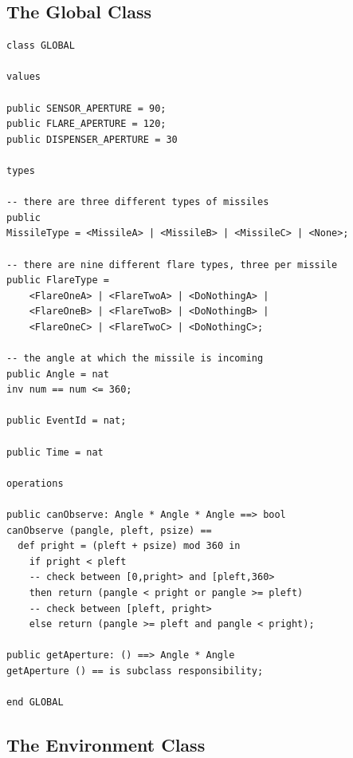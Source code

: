 \documentclass{overturerepchap}
\begin{document}
\subsection{The Global Class}

\begin{lstlisting}
class GLOBAL

values

public SENSOR_APERTURE = 90;
public FLARE_APERTURE = 120;
public DISPENSER_APERTURE = 30

types

-- there are three different types of missiles
public 
MissileType = <MissileA> | <MissileB> | <MissileC> | <None>;

-- there are nine different flare types, three per missile
public FlareType =
    <FlareOneA> | <FlareTwoA> | <DoNothingA> | 
    <FlareOneB> | <FlareTwoB> | <DoNothingB> | 
    <FlareOneC> | <FlareTwoC> | <DoNothingC>;

-- the angle at which the missile is incoming
public Angle = nat
inv num == num <= 360;

public EventId = nat;

public Time = nat

operations

public canObserve: Angle * Angle * Angle ==> bool
canObserve (pangle, pleft, psize) ==
  def pright = (pleft + psize) mod 360 in
    if pright < pleft
    -- check between [0,pright> and [pleft,360>
    then return (pangle < pright or pangle >= pleft)
    -- check between [pleft, pright>
    else return (pangle >= pleft and pangle < pright);
       
public getAperture: () ==> Angle * Angle
getAperture () == is subclass responsibility;

end GLOBAL
\end{lstlisting}

\subsection{The Environment Class}
\end{document}
